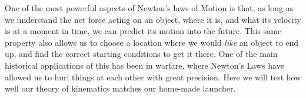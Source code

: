 
\label{lab:ProjectileMotion}

\apparatus
{}


\introduction

One of the most powerful aspects of Newton's laws of Motion is that, as long as we understand the net force acting on an object, where it is, and what its velocity is at a moment in time, we can predict its motion into the future. This same property also allows us to choose a location where we would \emph{like} an object to end up, and find the correct starting conditions to get it there.  One of the main historical applications of this has been in warfare, where Newton's Laws have allowed us to hurl things at each other with great precision.  Here we will test how well our theory of kinematics matches our home-made launcher.

\observations


